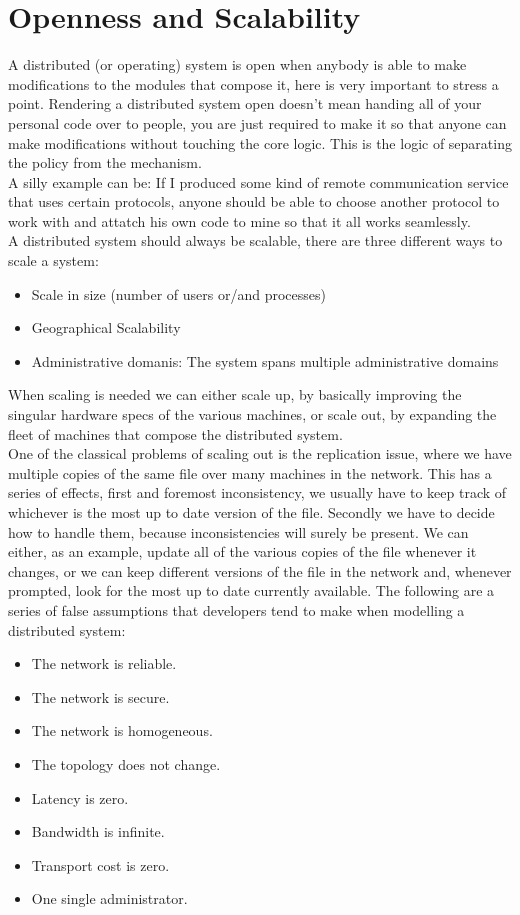 \section{Openness and Scalability}
A distributed (or operating) system is open when anybody is able to make modifications to the modules that compose it, here is very important to stress a point. Rendering a distributed system open doesn't mean handing all of your personal code over to people, you are just required to make it so that anyone can make modifications without touching the core logic. This is the logic of separating the policy from the mechanism. \\
A silly example can be: If I produced some kind of remote communication service that uses certain protocols, anyone should be able to choose another protocol to work with and attatch his own code to mine so that it all works seamlessly. \\
A distributed system should always be scalable, there are three different ways to scale a system:
\begin{itemize}
    \item Scale in size (number of users or/and processes)
    \item Geographical Scalability
    \item Administrative domanis: The system spans multiple administrative domains
\end{itemize}
When scaling is needed we can either scale up, by basically improving the singular hardware specs of the various machines, or scale out, by expanding the fleet of machines that compose the distributed system. \\
One of the classical problems of scaling out is the replication issue, where we have multiple copies of the same file over many machines in the network. This has a series of effects, first and foremost inconsistency, we usually have to keep track of whichever is the most up to date version of the file. Secondly we have to decide how to handle them, because inconsistencies will surely be present. We can either, as an example, update all of the various copies of the file whenever it changes, or we can keep different versions of the file in the network and, whenever prompted, look for the most up to date currently available.
\subSpace
The following are a series of false assumptions that developers tend to make when modelling a distributed system:
\begin{itemize}
    \item The network is reliable.
    \item The network is secure.
    \item The network is homogeneous.
    \item The topology does not change.
    \item Latency is zero.
    \item Bandwidth is infinite.
    \item Transport cost is zero.
    \item One single administrator.
\end{itemize}

